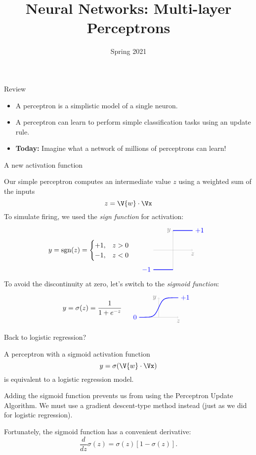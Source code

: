 \documentclass[9pt]{beamer}
\title{Neural Networks: Multi-layer Perceptrons}
\date{Spring 2021}
\begin{document}
\maketitle

\begin{frame}{Review}

\begin{itemize}
	\item A perceptron is a simplistic model of a single neuron.
	\item A perceptron can learn to perform simple classification tasks using an update rule.
	\item \textbf{Today:} Imagine what a network of millions of perceptrons can learn!
\end{itemize}
	
\end{frame}

\begin{frame}{A new activation function}

Our simple perceptron computes an intermediate value $z$ using a weighted sum of the inputs
\[ z = \V{w}\cdot\Vx \]
To simulate firing, we used the \emph{sign function} for activation:
\[ 
	y = \mathrm{sgn}(z) = \begin{cases} +1, & z > 0 \\ -1, & z < 0 \end{cases} \quad
	\raisebox{-0.45in}{
		\begin{tikzpicture}
			\draw [help lines,->] (-1,0) -- (1,0) node [below] {$z$};
			\draw [help lines,->] (0,-1) -- (0,1) node [left] {$y$};
			\draw [thick,blue] (-1,-1) node [left] {$-1$} -- (0,-1) (0,1) -- (1,1) node [right] {$+1$};
		\end{tikzpicture}
	}
\]
To avoid the discontinuity at zero, let's switch to the \emph{sigmoid function}:
\[ 
	y = \sigma(z) = \frac{1}{1 + e^{-z}} \quad
	\raisebox{-0.3in}{
		\begin{tikzpicture}
			\draw [help lines,->] (-1,0) -- (1,0) node [below] {$z$};
			\draw [help lines,->] (0,0) -- (0,1) node [left] {$y$};
			\draw [thick,blue, xscale=0.111, domain=-9:9] plot (\x, {1/(1+exp(-\x)});
			\node [blue,left] at (-1,0) {$0$};
			\node [blue,right] at (1,1) {$+1$};
		\end{tikzpicture}
	}
\]

\end{frame}

\begin{frame}{Back to logistic regression?}

A perceptron with a sigmoid activation function
\[ y = \sigma(\V{w}\cdot\Vx) \]
is equivalent to a logistic regression model.

\pause
\bigskip
Adding the sigmoid function prevents us from using the Perceptron Update Algorithm. We must use a gradient descent-type method instead (just as we did for logistic regression).

\bigskip
Fortunately, the sigmoid function has a convenient derivative:
\[ \frac{d}{dz}\sigma(z) = \sigma(z)[1 - \sigma(z)]. \]
	
\end{frame}
\end{document}

